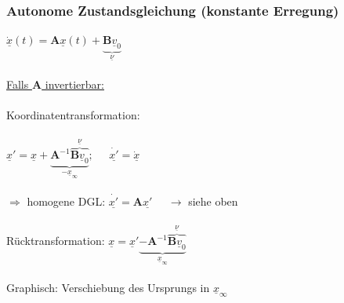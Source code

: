 \documentclass[a4paper,twocolumn,10pt]{article}
\begin{document}
\subsubsection*{Autonome Zustandsgleichung (konstante Erregung)}
$\underline{\dot{x}}(t)=\textbf{A}\underline{x}(t)+\underbrace{\textbf{B}\underline{v}_0}_{\underline{\nu}}$\\\\
\underline{Falls $\textbf{A}$ invertierbar:}\\\\
Koordinatentransformation:\\\\ $\underline{x}'=\underline{x}+\underbrace{\textbf{A}^{-1}\overbrace{\textbf{B}\underline{v}_0}^{\underline{\nu}}}_{-\underline{x}_{\infty}};\;\;\;\;\;\underline{\dot{x'}}=\underline{\dot{x}}$\\\\
$\Rightarrow$ homogene DGL: $\underline{\dot{x'}}=\textbf{A}\underline{x'}\;\;\;\;\;\rightarrow$ siehe oben\\\\
Rücktransformation: $\underline{x}=\underline{x}'\underbrace{-\textbf{A}^{-1} \overbrace{\textbf{B}\underline{v}_0}^{\underline{\nu}}}_{\underline{x}_{\infty}}$\\\\
Graphisch: Verschiebung des Ursprungs in $\underline{x}_{\infty}$
\end{document}
